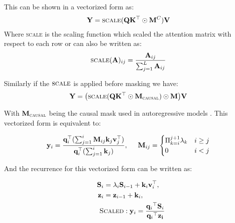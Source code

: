 This can be shown in a vectorized form as:
\begin{align}
   \mathbf{Y} = \textsc{scale}(\mathbf{Q}\mathbf{K}^{\top} \odot \mathbf{M}^C) \mathbf{V}
\end{align}
Where \textsc{scale} is the scaling function which scaled the attention matrix with respect to each row or can also be written as:
\begin{align}
   \textsc{scale}(\mathbf{A})_{ij} = \frac{\mathbf{A}_{ij}}{\sum_{j=1}^L\mathbf{A}_{ij}}
\end{align}

Similarly if the $\textsc{scale}$ is applied before masking we have:
\begin{align}
\label{eq:scalecm}
   \mathbf{Y} = \big(\textsc{scale}(\mathbf{Q}\mathbf{K}^{\top} \odot \mathbf{M}_{\textsc{causal}})\odot \mathbf{M}\big) \mathbf{V}
\end{align}

With $\mathbf{M}_{\textsc{causal}}$ being the causal mask used in autoregressive models \citep{gpt}. This vectorized form is equivalent to:

\begin{minipage}[t]{1\textwidth}  
\begin{align}
\label{eq:yscale}
\mathbf{y}_i = \frac{\mathbf{q}^{\top}_i(\sum_{j=1}^i \mathbf{M}_{ij}\mathbf{k}_j\mathbf{v}^{\top}_j)}{\mathbf{q}^{\top}_i(\sum_{j=1}^i \mathbf{k}_j)},  \hspace{5mm}   \mathbf{M}_{ij} = 
    \begin{cases} 
    \Pi_{k=i}^{j+1}{\lambda_k} & i \geq j  \\
    0 & i < j
\end{cases}
\end{align}
\end{minipage}

And the recurrence for this vectorized form can be written as:

\begin{align}
\label{eq:recurscaleafter}
    \mathbf{S}_i &= \textcolor{black}{{\lambda_i}} \mathbf{S}_{i-1} + \mathbf{k}_i \mathbf{v}_i^{\top}, \\
    \mathbf{z}_i & =  \mathbf{z}_{i-1} + {\mathbf{k}_i}, \\
    \hspace{4mm} \textsc{S}&\textsc{caled}: \mathbf{y}_i= \frac{{{\mathbf{q}_i}}^{\top} \mathbf{S}_i}{{{\mathbf{q}_i}}^{\top} \mathbf{z_i}} \label{eq:scaling_zi}
\end{align}

